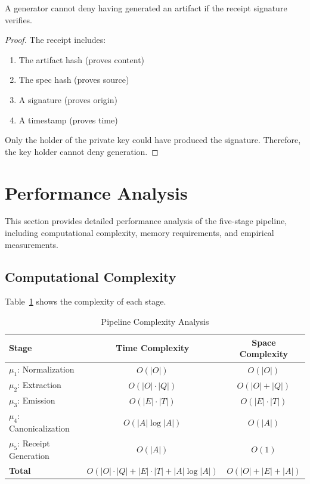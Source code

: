 \begin{theorem}
    A generator cannot deny having generated an artifact if the receipt signature verifies.
\end{theorem}

\begin{proof}
    The receipt includes:
    \begin{enumerate}
        \item The artifact hash (proves content)
        \item The spec hash (proves source)
        \item A signature (proves origin)
        \item A timestamp (proves time)
    \end{enumerate}
    Only the holder of the private key could have produced the signature. Therefore, the key holder cannot deny generation.
\end{proof}

\section{Performance Analysis}

This section provides detailed performance analysis of the five-stage pipeline, including computational complexity, memory requirements, and empirical measurements.

\subsection{Computational Complexity}

Table~\ref{tab:complexity} shows the complexity of each stage.

\begin{table}[h]
\centering
\caption{Pipeline Complexity Analysis}
\label{tab:complexity}
\begin{tabular}{lcc}
\toprule
\textbf{Stage} & \textbf{Time Complexity} & \textbf{Space Complexity} \\
\midrule
\(\mu_1\): Normalization & \(O(|O|)\) & \(O(|O|)\) \\
\(\mu_2\): Extraction & \(O(|O| \cdot |Q|)\) & \(O(|O| + |Q|)\) \\
\(\mu_3\): Emission & \(O(|E| \cdot |T|)\) & \(O(|E| \cdot |T|)\) \\
\(\mu_4\): Canonicalization & \(O(|A| \log |A|)\) & \(O(|A|)\) \\
\(\mu_5\): Receipt Generation & \(O(|A|)\) & \(O(1)\) \\
\midrule
\textbf{Total} & \(O(|O| \cdot |Q| + |E| \cdot |T| + |A| \log |A|)\) & \(O(|O| + |E| + |A|)\) \\
\bottomrule
\end{tabular}
\end{table}

